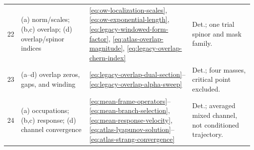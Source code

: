\documentclass[aps,prb,twocolumn,floatfix,nofootinbib,superscriptaddress]{revtex4-2}
\begin{document}
\begin{table}[!t]
\begin{tabularx}{\textwidth}{p{}p{}Xp{}}
22 & (a) norm/scales; (b,c) overlap; (d) overlap/spinor indices
& \eqref{eq:ow-localization-scales}, \eqref{eq:ow-exponential-length},
\eqref{eq:legacy-windowed-form-factor}, \eqref{eq:atlas-overlap-magnitude},
\eqref{eq:legacy-overlap-chern-index}
& Det.; one trial spinor and mask family.\\
23 & (a--d) overlap zeros, gaps, and winding
& \eqref{eq:legacy-overlap-dual-section}--\eqref{eq:legacy-overlap-alpha-sweep}
& Det.; four masses, critical point excluded.\\
24 & (a) occupations; (b,c) response; (d) channel convergence
& \eqref{eq:mean-frame-operators}--\eqref{eq:mean-branch-selection},
\eqref{eq:mean-response-velocity}, \eqref{eq:atlas-lyapunov-solution}--
\eqref{eq:atlas-strang-convergence}
& Det.; averaged mixed channel, not conditioned trajectory.\\
\bottomrule
\end{tabularx}
\end{table}

\clearpage

\end{document}
